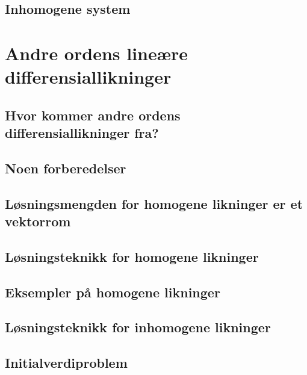 \documentclass{article}
\begin{document}
\subsection{Inhomogene system}


\section{Andre ordens lineære differensiallikninger}

\subsection{Hvor kommer andre ordens differensiallikninger fra?}
\subsection{Noen forberedelser}
\subsection{Løsningsmengden for homogene likninger er et vektorrom}
\subsection{Løsningsteknikk for homogene likninger}
\subsection{Eksempler på homogene likninger}
\subsection{Løsningsteknikk for inhomogene likninger}
\subsection{Initialverdiproblem}
\end{document}
